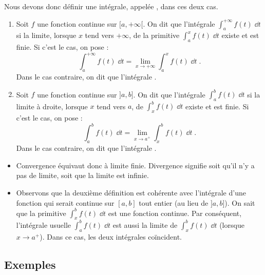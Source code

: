 \documentclass[class=report,crop=false]{standalone}
\begin{document}
Nous devons donc définir une intégrale, appelée , dans ces deux cas.
\begin{definition}
\label{def:intcv}
\begin{enumerate}
\item Soit $f$ une fonction continue sur $[a,+\infty[$.
On dit que l'intégrale $\int_a^{+\infty} f(t)\;\dd t$  si
la limite, lorsque $x$ tend vers $+\infty$, de la primitive 
$\int_a^{x} f(t)\;\dd t$ existe et est finie. Si c'est le cas, on pose :
\begin{equation}
\label{intcv1}
\int_a^{+\infty} f(t)\;\dd t = \lim_{x\rightarrow+\infty} 
\int_a^x f(t)\;\dd t\;. 
\end{equation}
Dans le cas contraire, on dit que l'intégrale .

\item Soit $f$ une fonction continue sur $]a,b]$.
On dit que l'intégrale $\int_a^b f(t)\;\dd t$  si
la limite à droite, lorsque $x$ tend vers $a$, de 
$\int_x^{b} f(t)\;\dd t$ existe et est finie. Si c'est le cas, on pose :
\begin{equation}
\label{intcv2}
\int_a^{b} f(t)\;\dd t = \lim_{x\rightarrow a^+} 
\int_x^b f(t)\;\dd t\;. 
\end{equation}
Dans le cas contraire, on dit que l'intégrale .
\end{enumerate}
\end{definition}


\begin{remarque*}
\begin{itemize}
  \item Convergence équivaut donc à limite finie. Divergence signifie soit qu'il 
  n'y a pas de limite, soit que la limite est infinie.
  
  \item Observons que la deuxième définition est cohérente avec l'intégrale d'une fonction 
qui serait continue sur $[a,b]$ tout entier (au lieu de $]a,b]$).
On sait que la primitive $\int_x^b f(t)\;\dd t$ est une fonction continue.
Par conséquent, l'intégrale usuelle $\int_a^b f(t)\;\dd t$ est aussi
la limite de $\int_x^b f(t)\;\dd t$ (lorsque $x \to a^+$). Dans ce cas, les 
deux intégrales coïncident. 
\end{itemize}
\end{remarque*}



\subsection{Exemples}
\end{document}
